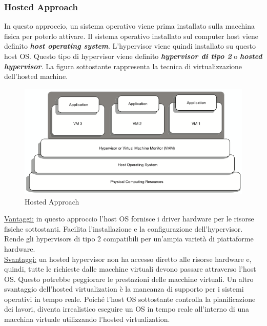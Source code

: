 \documentclass{article}
\begin{document}
\subsubsection{Hosted Approach}
In questo approccio, un sistema operativo viene prima installato sulla macchina fisica per poterlo attivare. Il sistema operativo installato sul computer host viene definito \textit{\textbf{host operating system}}. L'hypervisor viene quindi installato su questo host OS. Questo tipo di hypervisor viene definito \textit{\textbf{hypervisor di tipo 2}} o \textit{\textbf{hosted hypervisor}}. La figura sottostante rappresenta la tecnica di virtualizzazione dell’hosted machine.
\begin{figure}[H]
    \centering
    \includegraphics[scale=0.8]{img/hosted approach.png}
    \caption{Hosted Approach}
\end{figure}\noindent
\uline{Vantaggi:} in questo approccio l’host OS fornisce i driver hardware per le risorse fisiche sottostanti. Facilita l'installazione e la configurazione dell'hypervisor. Rende gli hypervisors di tipo 2 compatibili per un'ampia varietà di piattaforme hardware. \\
\uline{Svantaggi:} un hosted hypervisor non ha accesso diretto alle risorse hardware e, quindi, tutte le richieste dalle macchine virtuali devono passare attraverso l’host OS. Questo potrebbe peggiorare le prestazioni delle macchine virtuali. Un altro svantaggio dell’hosted virtualization è la mancanza di supporto per i sistemi operativi in tempo reale. Poiché l’host OS sottostante controlla la pianificazione dei lavori, diventa irrealistico eseguire un OS in tempo reale all'interno di una macchina virtuale utilizzando l’hosted virtualization.
\end{document}
